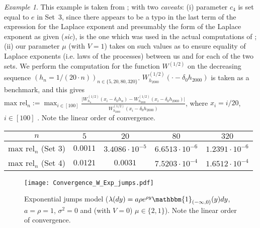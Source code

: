 \documentclass[pdftex,oneside,11pt,reqno]{amsart}
\theoremstyle{definition}
\theoremstyle{theorem}
\theoremstyle{remark}
\newtheorem{example}{Example}[section]
\numberwithin{equation}{section}
\numberwithin{definition}{section}
\begin{document}
\begin{example}\label{example:compare}
This example is taken from \cite[pp. 177-178; Eq.~(137), Table~4 (Sets~3 and~4)]{kuznetsovkyprianourivero}; with two \emph{caveats}: (i) parameter $c_4$ is set equal to $e$ in Set~3, since there appears to be a typo in the last term of the expression for the Laplace exponent \cite[p. 178, Equation~(138)]{kuznetsovkyprianourivero} and presumably the form of the Laplace exponent as given (\emph{sic}), is the one which was used in the actual computations of \cite{kuznetsovkyprianourivero}; (ii) our parameter $\mu$ (with $V=1$) takes on such values as to ensure equality of Laplace exponents (i.e. laws of the processes) between us and \cite{kuznetsovkyprianourivero} for each of the two sets. We perform the computation for the function $W^{(1/2)}$ on the decreasing sequence $(h_n=1/(20\cdot n))_{n\in \{5,20,80,320\}}$.  ${W}_{h_{2000}}^{(1/2)}(\cdot-\delta_0h_{2000})$ is taken as a benchmark, and this gives $\text{max rel}_n:=\max_{i\in [100]}\frac{\vert W_{h_n}^{(1/2)}(x_i-\delta_0h_n)-W_{h_{2000}}^{(1/2)}(x_i-\delta_0h_{2000})\vert}{W_{h_{2000}}^{(1/2)}(x_i-\delta_0h_{2000})}$, where $x_i=i/20$, $i\in [100]$ . Note the linear order of convergence.
\vspace{0.25cm}

\begin{center}
\begin{tabular}{|c|c|c|c|c|}\hline
$n$ & $5$ & $20$ & $80$ & $320$  \\\hline
$\text{max rel}_n$ (Set 3) & $ 0.0011$ & $3.4086\cdot 10^{-5}$ & $6.6513\cdot 10^{-6}$ & $1.2391\cdot 10^{-6}$  \\\hline
$\text{max rel}_n$ (Set 4) & $0.0121$ & $0.0031$ & $7.5203\cdot 10^{-4}$ & $1.6512\cdot 10^{-4}$ \\\hline 
\end{tabular}
\label{table:sets}
\end{center}

\end{example}

\begin{figure}[!htb]
\texttt{[image: Convergence\_W\_Exp\_jumps.pdf]}
\caption{Exponential jumps model (${\lambda}(dy)=a\rho e^{\rho y}\mathbbm{1}_{(-\infty,0)}(y)dy$, $a=\rho=1$, ${\sigma^2}=0$ and (with $V=0$) $\mu\in \{2,1\}$). Note the linear order of convergence. }
\label{fig:W_convergence_Exp_jumps}
\end{figure}
\end{document}
